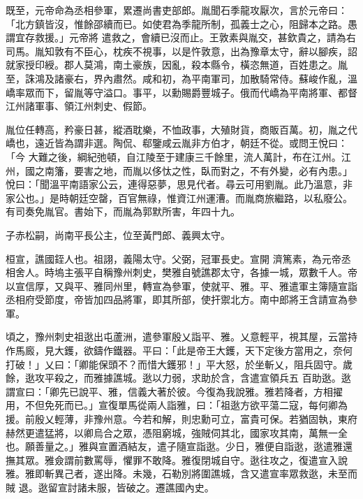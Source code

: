 \begin{pinyinscope}
 既至，元帝命為丞相參軍，累遷尚書吏部郎。胤聞石季龍攻厭次，言於元帝曰：「北方鎮皆沒，惟餘邵續而已。如使君為季龍所制，孤義士之心，阻歸本之路。愚謂宜存救援。」元帝將
 遣救之，會續已沒而止。王敦素與胤交，甚欽貴之，請為右司馬。胤知敦有不臣心，枕疾不視事，以是忤敦意，出為豫章太守，辭以腳疾，詔就家授印綬。郡人莫鴻，南土豪族，因亂，殺本縣令，橫恣無道，百姓患之。胤至，誅鴻及諸豪右，界內肅然。咸和初，為平南軍司，加散騎常侍。蘇峻作亂，溫嶠率眾而下，留胤等守溢口。事平，以勳賜爵豐城子。俄而代嶠為平南將軍、都督江州諸軍事、領江州刺史、假節。



 胤位任轉高，矜豪日甚，縱酒耽樂，不恤政事，大殖財貨，商販百萬。初，胤之代嶠也，遠近皆為謂非選。陶侃、郗鑒咸云胤非方伯才，朝廷不從。或問王悅曰：「今
 大難之後，綱紀弛頓，自江陵至于建康三千餘里，流人萬計，布在江州。江州，國之南籓，要害之地，而胤以侈忲之性，臥而對之，不有外變，必有內患。」悅曰：「聞溫平南語家公云，連得惡夢，思見代者。尋云可用劉胤。此乃溫意，非家公也。」是時朝廷空罄，百官無祿，惟資江州運漕。而胤商旅繼路，以私廢公。有司奏免胤官。書始下，而胤為郭默所害，年四十九。



 子赤松嗣，尚南平長公主，位至黃門郎、義興太守。



 桓宣，譙國銍人也。祖詡，義陽太守。父弼，冠軍長史。宣開
 濟篤素，為元帝丞相舍人。時塢主張平自稱豫州刺史，樊雅自號譙郡太守，各據一城，眾數千人。帝以宣信厚，又與平、雅同州里，轉宣為參軍，使就平、雅。平、雅遣軍主簿隨宣詣丞相府受節度，帝皆加四品將軍，即其所部，使扞禦北方。南中郎將王含請宣為參軍。



 頃之，豫州刺史祖逖出屯蘆洲，遣參軍殷乂詣平、雅。乂意輕平，視其屋，云當持作馬廄，見大鑊，欲鑄作鐵器。平曰：「此是帝王大鑊，天下定後方當用之，奈何打破！」乂曰：「卿能保頭不？而惜大鑊邪！」平大怒，於坐斬乂，阻兵固守。歲餘，逖攻平殺之，而雅據譙城。逖以力弱，求助於含，含遣宣領兵五
 百助逖。逖謂宣曰：「卿先已說平、雅，信義大著於彼。今復為我說雅。雅若降者，方相擢用，不但免死而已。」宣復單馬從兩人詣雅，曰：「祖逖方欲平蕩二寇，每何卿為援。前殷乂輕薄，非豫州意。今若和解，則忠勳可立，富貴可保。若猶固執，東府赫然更遣猛將，以卿烏合之眾，憑阻窮城，強賊伺其北，國家攻其南，萬無一全也。願善量之。」雅與宣置酒結友，遣子隨宣詣逖。少日，雅便自詣逖，逖遣雅還撫其眾。雅僉謂前數罵辱，懼罪不敢降。雅復閉城自守。逖往攻之，復遣宣入說雅。雅即斬異己者，遂出降。未幾，石勒別將圍譙城，含又遣宣率眾救逖，未至而賊
 退。逖留宣討諸未服，皆破之。遷譙國內史。




\end{pinyinscope}
